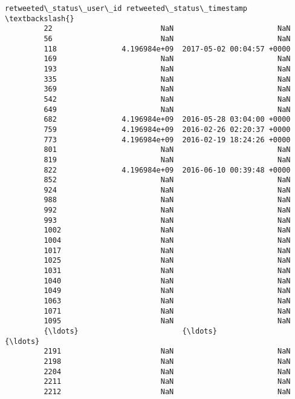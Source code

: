 \documentclass[11pt]{article}
\begin{document}
\begin{Verbatim}[commandchars=\\\{\}]
               retweeted\_status\_user\_id retweeted\_status\_timestamp  \textbackslash{}
         22                         NaN                        NaN   
         56                         NaN                        NaN   
         118               4.196984e+09  2017-05-02 00:04:57 +0000   
         169                        NaN                        NaN   
         193                        NaN                        NaN   
         335                        NaN                        NaN   
         369                        NaN                        NaN   
         542                        NaN                        NaN   
         649                        NaN                        NaN   
         682               4.196984e+09  2016-05-28 03:04:00 +0000   
         759               4.196984e+09  2016-02-26 02:20:37 +0000   
         773               4.196984e+09  2016-02-19 18:24:26 +0000   
         801                        NaN                        NaN   
         819                        NaN                        NaN   
         822               4.196984e+09  2016-06-10 00:39:48 +0000   
         852                        NaN                        NaN   
         924                        NaN                        NaN   
         988                        NaN                        NaN   
         992                        NaN                        NaN   
         993                        NaN                        NaN   
         1002                       NaN                        NaN   
         1004                       NaN                        NaN   
         1017                       NaN                        NaN   
         1025                       NaN                        NaN   
         1031                       NaN                        NaN   
         1040                       NaN                        NaN   
         1049                       NaN                        NaN   
         1063                       NaN                        NaN   
         1071                       NaN                        NaN   
         1095                       NaN                        NaN   
         {\ldots}                        {\ldots}                        {\ldots}   
         2191                       NaN                        NaN   
         2198                       NaN                        NaN   
         2204                       NaN                        NaN   
         2211                       NaN                        NaN   
         2212                       NaN                        NaN   

\end{Verbatim}
\end{document}
